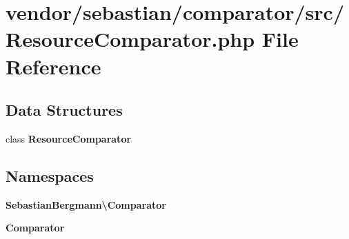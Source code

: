 \section{vendor/sebastian/comparator/src/\+Resource\+Comparator.php File Reference}
\label{_resource_comparator_8php}
\subsection*{Data Structures}
\begin{DoxyCompactItemize}
\item 
class {\bf Resource\+Comparator}
\end{DoxyCompactItemize}
\subsection*{Namespaces}
\begin{DoxyCompactItemize}
\item 
 {\bf Sebastian\+Bergmann\textbackslash{}\+Comparator}
\item 
 {\bf Comparator}
\end{DoxyCompactItemize}
